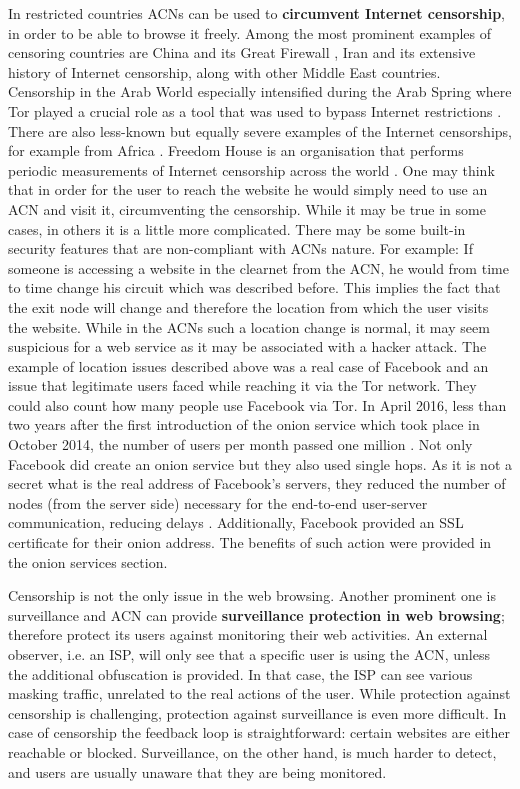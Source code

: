 In restricted countries ACNs can be used to \textbf{circumvent Internet censorship}, in order to be able to browse it freely. Among the most prominent examples of censoring countries are China and its Great Firewall \cite{gfw-china}, Iran and its extensive history of Internet censorship, along with other Middle East countries. Censorship in the Arab World especially intensified during the Arab Spring where Tor played a crucial role as a tool that was used to bypass Internet restrictions \cite{arab-spring}. There are also less-known but equally severe examples of the Internet censorships, for example from Africa \cite{africa}. Freedom House is an organisation that performs periodic measurements of Internet censorship across the world \cite{freedomhouse_internet}.
One may think that in order for the user to reach the website he would simply need to use an ACN and visit it, circumventing the censorship. While it may be true in some cases, in others it is a little more complicated. There may be some built-in security features that are non-compliant with ACNs nature. For example: If someone is accessing a website in the clearnet from the ACN, he would from time to time change his circuit which was described before. This implies the fact that the exit node will change and therefore the location from which the user visits the website. While in the ACNs such a location change is normal, it may seem suspicious for a web service as it may be associated with a hacker attack.
The example of location issues described above was a real case of Facebook and an issue that legitimate users faced while reaching it via the Tor network. They could also count how many people use Facebook via Tor. In April 2016, less than two years after the first introduction of the onion service which took place in October 2014, the number of users per month passed one million \cite{facebook-tor-note}. Not only Facebook did create an onion service but they also used single hops. As it is not a secret what is the real address of Facebook's servers, they reduced the number of nodes (from the server side) necessary for the end-to-end user-server communication, reducing delays \cite{facebook-tor}. Additionally, Facebook provided an SSL certificate for their onion address. The benefits of such action were provided in the onion services section.

Censorship is not the only issue in the web browsing. Another prominent one is surveillance and ACN can provide \textbf{surveillance protection in web browsing}; therefore protect its users against monitoring their web activities. An external observer, i.e. an ISP, will only see that a specific user is using the ACN, unless the additional obfuscation is provided. In that case, the ISP can see various masking traffic, unrelated to the real actions of the user. 
While protection against censorship is challenging, protection against surveillance is even more difficult. In case of censorship the feedback loop is straightforward: certain websites are either reachable or blocked. Surveillance, on the other hand, is much harder to detect, and users are usually unaware that they are being monitored.

